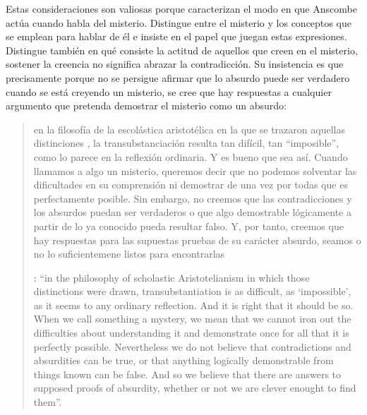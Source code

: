 Estas consideraciones son valiosas porque caracterizan el modo en que Anscombe actúa cuando habla del misterio. Distingue entre el misterio y los conceptos que se emplean para hablar de él e insiste en el papel que juegan estas expresiones. Distingue también en qué consiste la actitud de aquellos que creen en el misterio, sostener la creencia no significa abrazar la contradicción. Su insistencia es que precisamente porque no se persigue afirmar que lo absurdo puede ser verdadero cuando se está creyendo un misterio, se cree que hay respuestas a cualquier argumento que pretenda demostrar el misterio como un absurdo: \blockquote[
{\Cite[109]{anscombe1981erp:ot}}: \enquote{in the philosophy of scholastic Aristotelianism in which those distinctions  were drawn, transubstantiation is as difficult, as `impossible', as it seems to any ordinary reflection. And it is right that it should be so. When we call something a mystery, we mean that we cannot iron out the difficulties about understanding it and demonstrate once for all that it is perfectly possible. Nevertheless we do not believe that contradictions and absurdities can be true, or that anything logically demonstrable from things known can be false. And so we believe that there are answers to supposed proofs of absurdity, whether or not we are clever enought to find them}.
]{en la filosofía de la escolástica aristotélica en la que se trazaron aquellas distinciones , la transubstanciación resulta tan difícil, tan ``imposible'', como lo parece en la reflexión ordinaria. Y es bueno que sea así. Cuando llamamos a algo un misterio, queremos decir que no podemos solventar las dificultades en su comprensión ni demostrar de una vez por todas que es perfectamente posible. Sin embargo, no creemos que las contradicciones y los absurdos puedan ser verdaderos o que algo demostrable lógicamente a partir de lo ya conocido pueda resultar falso. Y, por tanto, creemos que hay respuestas para las supuestas pruebas de su carácter absurdo, seamos o no lo suficientemene listos para encontrarlas}.

